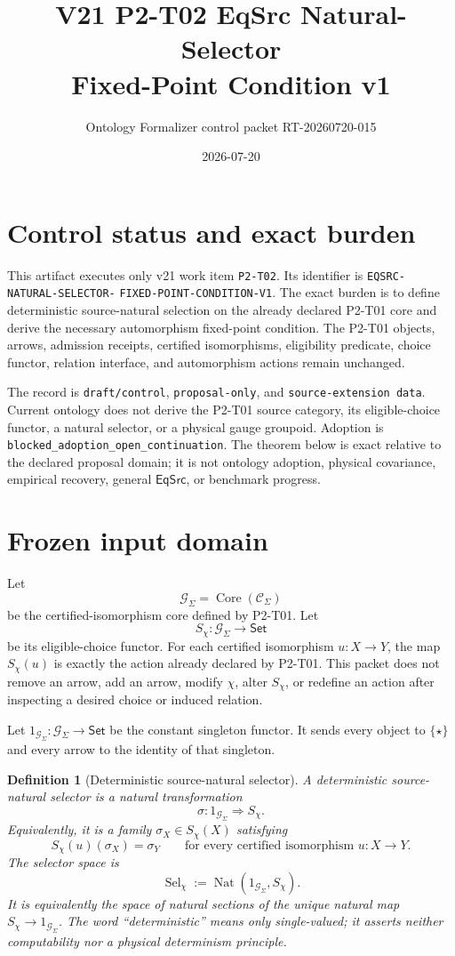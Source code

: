 \documentclass[11pt]{article}
\title{V21 P2-T02 EqSrc Natural-Selector\\
Fixed-Point Condition v1}
\author{Ontology Formalizer control packet RT-20260720-015}
\date{2026-07-20}
\newtheorem{definition}{Definition}
\newcommand{\Core}{\operatorname{Core}}
\newcommand{\Nat}{\operatorname{Nat}}
\newcommand{\Set}{\mathsf{Set}}
\newcommand{\EqSrc}{\mathsf{EqSrc}}
\begin{document}
\maketitle

\section{Control status and exact burden}

This artifact executes only v21 work item \texttt{P2-T02}. Its identifier is
\texttt{EQSRC-NATURAL-SELECTOR-}\allowbreak
\texttt{FIXED-POINT-CONDITION-V1}. The exact burden is
to define deterministic source-natural selection on the already declared
P2-T01 core and derive the necessary automorphism fixed-point condition. The
P2-T01 objects, arrows, admission receipts, certified isomorphisms,
eligibility predicate, choice functor, relation interface, and automorphism
actions remain unchanged.

The record is \texttt{draft/control}, \texttt{proposal-only}, and
\texttt{source-extension data}. Current ontology does not derive the P2-T01
source category, its eligible-choice functor, a natural selector, or a
physical gauge groupoid. Adoption is
\texttt{blocked\_adoption\_open\_continuation}. The theorem below is exact
relative to the declared proposal domain; it is not ontology adoption,
physical covariance, empirical recovery, general \(\EqSrc\), or benchmark
progress.

\section{Frozen input domain}

Let
\[
  \mathcal G_\Sigma=\Core(\mathcal C_\Sigma)
\]
be the certified-isomorphism core defined by P2-T01. Let
\[
  S_\chi:\mathcal G_\Sigma\longrightarrow\Set
\]
be its eligible-choice functor. For each certified isomorphism
\(u:X\to Y\), the map \(S_\chi(u)\) is exactly the action already declared
by P2-T01. This packet does not remove an arrow, add an arrow, modify
\(\chi\), alter \(S_\chi\), or redefine an action after inspecting a desired
choice or induced relation.

Let \(1_{\mathcal G_\Sigma}:\mathcal G_\Sigma\to\Set\) be the constant
singleton functor. It sends every object to \(\{\star\}\) and every arrow to
the identity of that singleton.

\begin{definition}[Deterministic source-natural selector]
A deterministic source-natural selector is a natural transformation
\[
  \sigma:1_{\mathcal G_\Sigma}\Longrightarrow S_\chi.
\]
Equivalently, it is a family \(\sigma_X\in S_\chi(X)\) satisfying
\[
  S_\chi(u)(\sigma_X)=\sigma_Y
  \qquad\text{for every certified isomorphism }u:X\to Y.
\]
The selector space is
\[
  \operatorname{Sel}_\chi
  :=\Nat(1_{\mathcal G_\Sigma},S_\chi).
\]
It is equivalently the space of natural sections of the unique natural map
\(S_\chi\to1_{\mathcal G_\Sigma}\). The word ``deterministic'' means only
single-valued; it asserts neither computability nor a physical determinism
principle.
\end{definition}
\end{document}
